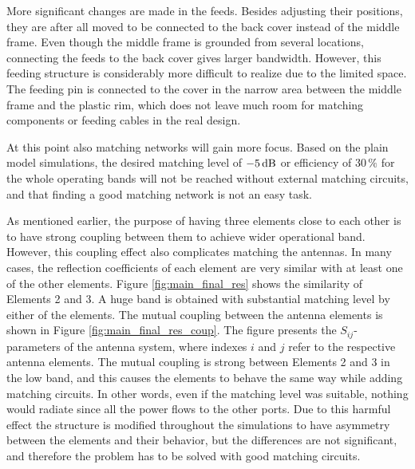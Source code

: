 More significant changes are made in the feeds. Besides adjusting their positions, they are after all moved to be connected to the back cover instead of the middle frame. Even though the middle frame is grounded from several locations, connecting the feeds to the back cover gives larger bandwidth. However, this feeding structure is considerably more difficult to realize due to the limited space. The feeding pin is connected to the cover in the narrow area between the middle frame and the plastic rim, which does not leave much room for matching components or feeding cables in the real design.

At this point also matching networks will gain more focus. Based on the plain model simulations, the desired matching level of $-5\,\mathrm{dB}$ or efficiency of $30\,\%$ for the whole operating bands will not be reached without external matching circuits, and that finding a good matching network is not an easy task.

As mentioned earlier, the purpose of having three elements close to each other is to have strong coupling between them to achieve wider operational band. However, this coupling effect also complicates matching the antennas. In many cases, the reflection coefficients of each element are very similar with at least one of the other elements. Figure \ref{fig:main_final_res} shows the similarity of Elements 2 and 3. A huge band is obtained with substantial matching level by either of the elements. The mutual coupling between the antenna elements is shown in Figure \ref{fig:main_final_res_coup}. The figure presents the $S_{ij}$-parameters of the antenna system, where indexes $i$ and $j$ refer to the respective antenna elements. The mutual coupling is strong between Elements 2 and 3 in the low band, and this causes the elements to behave the same way while adding matching circuits. In other words, even if the matching level was suitable, nothing would radiate since all the power flows to the other ports. Due to this harmful effect the structure is modified throughout the simulations to have asymmetry between the elements and their behavior, but the differences are not significant, and therefore the problem has to be solved with good matching circuits.

